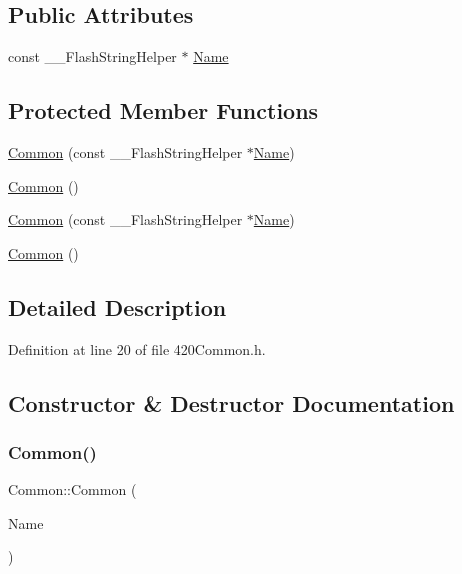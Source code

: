 \subsection*{Public Attributes}
\begin{DoxyCompactItemize}
\item 
const \+\_\+\+\_\+\+Flash\+String\+Helper $\ast$ \hyperlink{class_common_aeea91a726dbe988e515057b32ba0726f}{Name}
\end{DoxyCompactItemize}
\subsection*{Protected Member Functions}
\begin{DoxyCompactItemize}
\item 
\hyperlink{class_common_a1f240af5ca16ce9ff2195eadebb0e2a8}{Common} (const \+\_\+\+\_\+\+Flash\+String\+Helper $\ast$\hyperlink{class_common_aeea91a726dbe988e515057b32ba0726f}{Name})
\item 
\hyperlink{class_common_ab0898f6608707a3e07c22d88ecdae661}{Common} ()
\item 
\hyperlink{class_common_a1f240af5ca16ce9ff2195eadebb0e2a8}{Common} (const \+\_\+\+\_\+\+Flash\+String\+Helper $\ast$\hyperlink{class_common_aeea91a726dbe988e515057b32ba0726f}{Name})
\item 
\hyperlink{class_common_ab0898f6608707a3e07c22d88ecdae661}{Common} ()
\end{DoxyCompactItemize}


\subsection{Detailed Description}


Definition at line 20 of file 420\+Common.\+h.



\subsection{Constructor \& Destructor Documentation}
\mbox{\label{class_common_a1f240af5ca16ce9ff2195eadebb0e2a8}} 
\subsubsection{\texorpdfstring{Common()}{Common()}\hspace{0.1cm}{\footnotesize\ttfamily [1/4]}}
{\footnotesize\ttfamily Common\+::\+Common (\begin{DoxyParamCaption}\item[{const \+\_\+\+\_\+\+Flash\+String\+Helper $\ast$}]{Name }\end{DoxyParamCaption})\hspace{0.3cm}{\ttfamily [protected]}}



